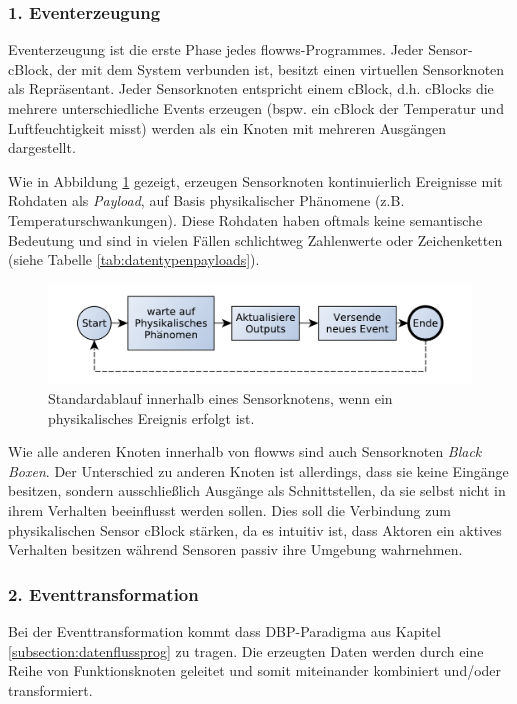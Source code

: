 \subsubsection{1. Eventerzeugung}
 Eventerzeugung ist die erste Phase jedes flowws-Programmes. Jeder Sensor-cBlock, der mit dem System verbunden ist, besitzt einen virtuellen Sensorknoten als Repräsentant. Jeder Sensorknoten entspricht einem cBlock, d.h. cBlocks die mehrere unterschiedliche Events erzeugen (bspw. ein cBlock der Temperatur und Luftfeuchtigkeit misst) werden als ein Knoten mit mehreren Ausgängen dargestellt. 
 
 Wie in Abbildung \ref{fig:seqsensorblock} gezeigt, erzeugen Sensorknoten kontinuierlich Ereignisse mit Rohdaten als \textit{Payload}, auf Basis physikalischer Phänomene (z.B. Temperaturschwankungen). Diese Rohdaten haben oftmals keine semantische Bedeutung und sind in vielen Fällen schlichtweg Zahlenwerte oder Zeichenketten (siehe Tabelle \ref{tab:datentypenpayloads}).
 
 \begin{figure}[h]
  \centering
  \includegraphics[width=1\textwidth]{bilder/chapter4/chapter4_2/sensorblockablauf.pdf}
  \caption{Standardablauf innerhalb eines Sensorknotens, wenn ein physikalisches Ereignis erfolgt ist.}
  \label{fig:seqsensorblock}
\end{figure}

 Wie alle anderen Knoten innerhalb von flowws sind auch Sensorknoten \textit{Black Boxen}. Der Unterschied zu anderen Knoten ist allerdings, dass sie keine Eingänge besitzen, sondern ausschließlich Ausgänge als Schnittstellen, da sie selbst nicht in ihrem Verhalten beeinflusst werden sollen. Dies soll die Verbindung zum physikalischen Sensor cBlock stärken, da es intuitiv ist, dass Aktoren ein aktives Verhalten besitzen während Sensoren passiv ihre Umgebung wahrnehmen. 
 
 \subsubsection{2. Eventtransformation}\label{subsubsec:eventtrans}
 Bei der Eventtransformation kommt dass \ac{DBP}-Paradigma aus Kapitel \ref{subsection:datenflussprog} zu tragen. Die erzeugten Daten werden durch eine Reihe von Funktionsknoten geleitet und somit miteinander kombiniert und/oder transformiert. 
 
